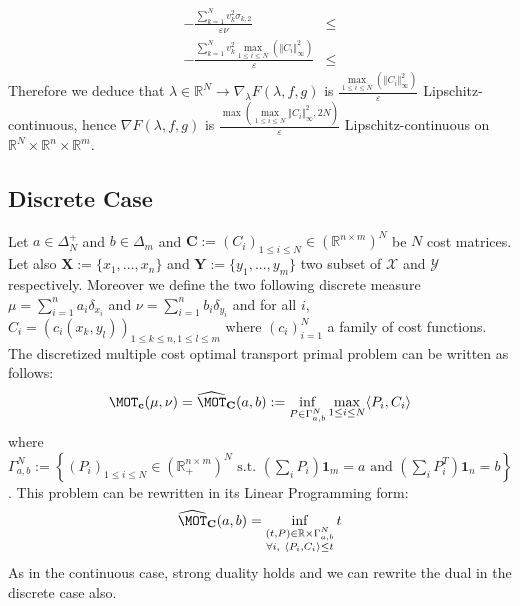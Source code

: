 \begin{prv*}
\begin{align*}
 - \frac{\sum_{k=1}^N v_k^2 \sigma_{k,2}}{\varepsilon\nu}  & \leq \\
  - \frac{\sum_{k=1}^N v_k^2 \max\limits_{1\leq i\leq N}(\Vert C_i\Vert_{\infty}^2) }{\varepsilon}  & \leq 
 \end{align*}
 Therefore we deduce that $\lambda\in\mathbb{R}^N \rightarrow \nabla_{\lambda} F(\lambda,f,g)$ is $\frac{\max\limits_{1\leq i\leq N}(\Vert C_i\Vert_{\infty}^2)}{\varepsilon}$ Lipschitz-continuous, hence $\nabla F(\lambda,f,g)$ is $\frac{\max\left(\max\limits_{1\leq i\leq N}\Vert C_i\Vert_{\infty}^2,2N\right)}{\varepsilon}$ Lipschitz-continuous on $\mathbb{R}^N\times \mathbb{R}^n \times\mathbb{R}^m$. 
\end{prv*}



\subsection{Discrete Case}
\label{sec:discrete}
Let $a\in\Delta_N^{+}$ and $b\in\Delta_m$ and $\mathbf{C}:=(C_i)_{1\leq i\leq N}\in\left(\mathbb{R}^{n\times m}\right)^N$ be $N$ cost matrices. Let also $\mathbf{X}:=\{x_1,...,x_n\}$ and $\mathbf{Y}:=\{y_1,...,y_m\}$ two subset of $\mathcal{X}$ and $\mathcal{Y}$ respectively. Moreover we define the two following discrete measure $\mu=\sum_{i=1}^n a_i \delta_{x_i}$ and $\nu=\sum_{i=1}^n b_i \delta_{y_i}$ and for all $i$, $C_i = (c_i(x_k,y_l))_{1\leq k\leq n,1\leq l\leq m}$ where $(c_i)_{i=1}^N$ a family of cost functions. The discretized multiple cost optimal transport primal problem can be written as follows:
\begin{align*}
\MOT_{\mathbf{c}}(\mu,\nu)=\widehat{\MOT}_{\textbf{C}}(a,b) := \inf_{P\in\Gamma_{a,b}^N}\max_{1\leq i\leq N} \langle P_i,C_i\rangle 
\end{align*}
where $\Gamma_{a,b}^N:=\left\{(P_i)_{1\leq i\leq N}\in\left(\mathbb{R}_+^{n\times m}\right)^N\text{ s.t. } (\sum_i P_i)\mathbf{1}_m=a \text{ and } (\sum_i P_i^T)\mathbf{1}_n=b \right\}$. This problem can be rewritten in its Linear Programming form:
\begin{align*}
\widehat{\MOT}_{\mathbf{C}}(a,b)=\inf\limits_{\substack{(t,P)\in \mathbb{R}\times \Gamma_{a,b}^N\\\forall i,~ \langle P_i,C_i\rangle\leq t}} t
\end{align*}
As in the continuous case, strong duality holds and we can rewrite the dual in the discrete case also.
